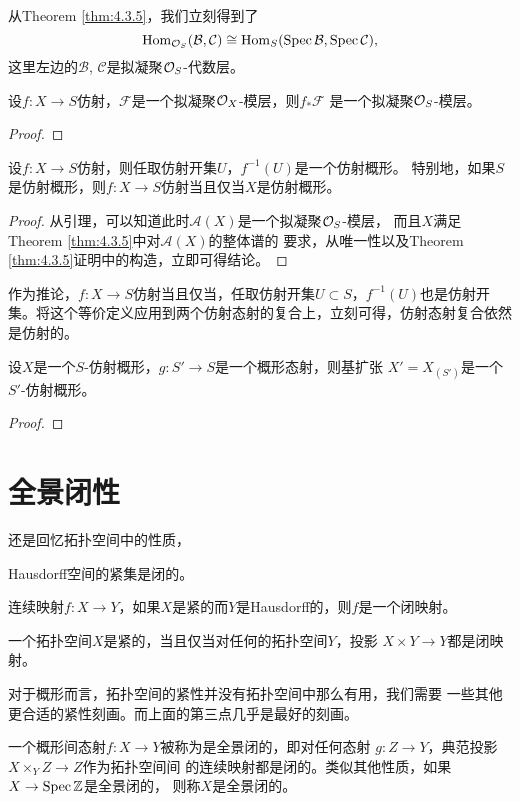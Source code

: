 从Theorem \ref{thm:4.3.5}，我们立刻得到了
\[
	\operatorname{Hom}_{\mathcal{O}_S}(\mathcal B,\mathcal C)\cong 
	\operatorname{Hom}_S(\operatorname{Spec}\mathcal B,\operatorname{Spec}\mathcal C),
\]
这里左边的$\mathcal B$, $\mathcal C$是拟凝聚$\mathcal{O}_S$-代数层。

\begin{lem}
设$f:X\to S$仿射，$\mathcal F$是一个拟凝聚$\mathcal{O}_X$-模层，则$f_*\mathcal F$
是一个拟凝聚$\mathcal{O}_S$-模层。
\end{lem}

\begin{proof}
\notprove
\end{proof}

\begin{pro}
设$f:X\to S$仿射，则任取仿射开集$U$，$f^{-1}(U)$是一个仿射概形。
特别地，如果$S$是仿射概形，则$f:X\to S$仿射当且仅当$X$是仿射概形。
\end{pro}

\begin{proof}
从引理，可以知道此时$\mathcal A(X)$是一个拟凝聚$\mathcal{O}_S$-模层，
而且$X$满足Theorem \ref{thm:4.3.5}中对$\mathcal A(X)$的整体谱的
要求，从唯一性以及Theorem \ref{thm:4.3.5}证明中的构造，立即可得结论。
\end{proof}

作为推论，$f:X\to S$仿射当且仅当，任取仿射开集$U\subset S$，$f^{-1}(U)$也是仿射开集。将这个等价定义应用到两个仿射态射的复合上，立刻可得，仿射态射复合依然是仿射的。

\begin{pro}
设$X$是一个$S$-仿射概形，$g:S'\to S$是一个概形态射，则基扩张
$X'=X_{(S')}$是一个$S'$-仿射概形。
\end{pro}

\begin{proof}
\notprove
\end{proof}


\section{全景闭性}

还是回忆拓扑空间中的性质，
\begin{compactenum}
\item Hausdorff空间的紧集是闭的。
\item 连续映射$f:X\to Y$，如果$X$是紧的而$Y$是Hausdorff的，则$f$是一个闭映射。
\item 一个拓扑空间$X$是紧的，当且仅当对任何的拓扑空间$Y$，投影
	$X\times Y\to Y$都是闭映射。
\end{compactenum}
对于概形而言，拓扑空间的紧性并没有拓扑空间中那么有用，我们需要
一些其他更合适的紧性刻画。而上面的第三点几乎是最好的刻画。

\begin{para}[全景闭性]
	一个概形间态射$f:X\to Y$被称为是全景闭的，即对任何态射
	$g:Z\to Y$，典范投影$X\times_Y Z\to Z$作为拓扑空间间
	的连续映射都是闭的。类似其他性质，如果$X\to \operatorname{Spec} \mathbb{Z}$是全景闭的，
	则称$X$是全景闭的。
\end{para}
